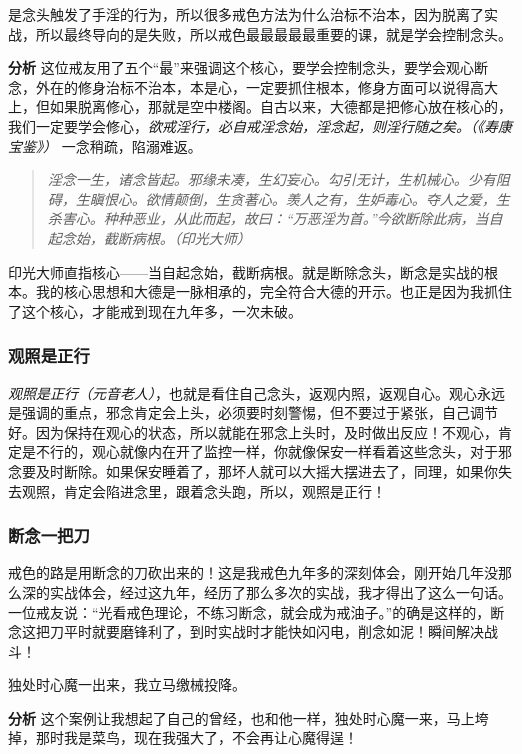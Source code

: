 \begin{case}
    是念头触发了手淫的行为，所以很多戒色方法为什么治标不治本，因为脱离了实战，所以最终导向的是失败，所以戒色最最最最最重要的课，就是学会控制念头。

    \textbf{分析} 这位戒友用了五个“最”来强调这个核心，要学会控制念头，要学会观心断念，外在的修身治标不治本，本是心，一定要抓住根本，修身方面可以说得高大上，但如果脱离修心，那就是空中楼阁。自古以来，大德都是把修心放在核心的，我们一定要学会修心，\textit{欲戒淫行，必自戒淫念始，淫念起，则淫行随之矣。（《寿康宝鉴》）} 一念稍疏，陷溺难返。

    \begin{quote}\it
        淫念一生，诸念皆起。邪缘未凑，生幻妄心。勾引无计，生机械心。少有阻碍，生瞋恨心。欲情颠倒，生贪著心。羡人之有，生妒毒心。夺人之爱，生杀害心。种种恶业，从此而起，故曰：“万恶淫为首。”今欲断除此病，当自起念始，截断病根。（印光大师）
    \end{quote}

    印光大师直指核心——当自起念始，截断病根。就是断除念头，断念是实战的根本。我的核心思想和大德是一脉相承的，完全符合大德的开示。也正是因为我抓住了这个核心，才能戒到现在九年多，一次未破。
\end{case}

\subsubsection{观照是正行}

\textit{观照是正行（元音老人）}，也就是看住自己念头，返观内照，返观自心。观心永远是强调的重点，邪念肯定会上头，必须要时刻警惕，但不要过于紧张，自己调节好。因为保持在观心的状态，所以就能在邪念上头时，及时做出反应！不观心，肯定是不行的，观心就像内在开了监控一样，你就像保安一样看着这些念头，对于邪念要及时断除。如果保安睡着了，那坏人就可以大摇大摆进去了，同理，如果你失去观照，肯定会陷进念里，跟着念头跑，所以，观照是正行！

\subsubsection{断念一把刀}

戒色的路是用断念的刀砍出来的！这是我戒色九年多的深刻体会，刚开始几年没那么深的实战体会，经过这九年，经历了那么多次的实战，我才得出了这么一句话。一位戒友说：“光看戒色理论，不练习断念，就会成为戒油子。”的确是这样的，断念这把刀平时就要磨锋利了，到时实战时才能快如闪电，削念如泥！瞬间解决战斗！

\begin{case}
    独处时心魔一出来，我立马缴械投降。

    \textbf{分析} 这个案例让我想起了自己的曾经，也和他一样，独处时心魔一来，马上垮掉，那时我是菜鸟，现在我强大了，不会再让心魔得逞！
\end{case}

